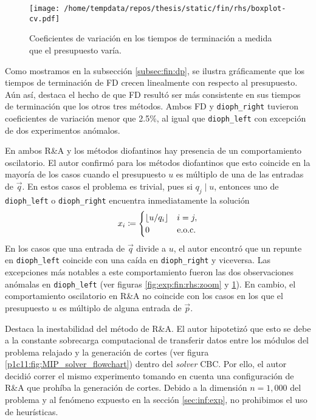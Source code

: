 \begin{figure}[hbtp]
	\centering
	\texttt{[image: /home/tempdata/repos/thesis/static/fin/rhs/boxplot-cv.pdf]}
	\caption{Coeficientes de variación en los tiempos de terminación a medida que el presupuesto
	varía.}
	\label{fig:exp:fin:rhs:cv}
\end{figure}

Como mostramos en la subsección \ref{subsec:fin:dp}, se ilustra gráficamente que los tiempos de
terminación de FD crecen linealmente con respecto al presupuesto. Aún así, destaca el hecho de que
FD resultó ser más consistente en sus tiempos de terminación que los otros tres métodos. Ambos FD y
\texttt{dioph\_right} tuvieron coeficientes de variación menor que 2.5\%, al igual que
\texttt{dioph\_left} con excepción de dos experimentos anómalos.

En ambos R\&A y los métodos diofantinos hay presencia de un comportamiento oscilatorio. El autor
confirmó para los métodos diofantinos que esto coincide en la mayoría de los casos cuando el
presupuesto $u$ es múltiplo de una de las entradas de $\vec{q}$. En estos casos el problema es
trivial, pues si $q_j \mid u$, entonces uno de \texttt{dioph\_left} o \texttt{dioph\_right}
encuentra inmediatamente la solución
\begin{equation*}
	x_i \coloneq \begin{cases}
		\left\lfloor u / q_i \right\rfloor & i = j, \\
		0 & \text{e.o.c.}
	\end{cases}
\end{equation*}
En los casos que una entrada de $\vec{q}$ divide a $u$, el autor encontró que un repunte en
\texttt{dioph\_left} coincide con una caída en \texttt{dioph\_right} y viceversa. Las excepciones
más notables a este comportamiento fueron las dos observaciones anómalas en \texttt{dioph\_left}
(ver figuras \ref{fig:exp:fin:rhs:zoom} y \ref{fig:exp:fin:rhs:cv}). En cambio, el comportamiento
oscilatorio en R\&A no coincide con los casos en los que el presupuesto $u$ es múltiplo de alguna
entrada de $\vec{p}$.

Destaca la inestabilidad del método de R\&A. El autor hipotetizó que esto se debe a la constante
sobrecarga computacional de transferir datos entre los módulos del problema relajado y la generación
de cortes (ver figura \ref{p1c11:fig:MIP_solver_flowchart}) dentro del \textit{solver} CBC. Por
ello, el autor decidió correr el mismo experimento tomando en cuenta una configuración de R\&A que
prohíba la generación de cortes. Debido a la dimensión $n = 1{,}000$ del problema y al fenómeno
expuesto en la sección \ref{sec:inf:exp}, no prohibimos el uso de heurísticas.

